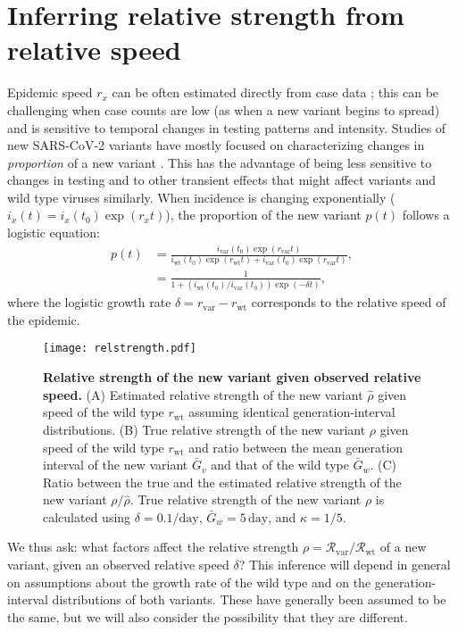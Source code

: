 \documentclass[12pt]{article}
\newcommand{\vvvar}{\mathrm{var}}
\newcommand{\wwwt}{\mathrm{wt}}
\newcommand{\rx}[1]{\ensuremath{{r}_{#1}}\xspace}
\newcommand{\rw}{\rx{\wwwt}}
\newcommand{\rv}{\rx{\vvvar}}
\newcommand{\Rx}[1]{\ensuremath{{\mathcal R}_{#1}}\xspace}
\newcommand{\Rw}{\Rx{\wwwt}}
\newcommand{\Rv}{\Rx{\vvvar}}
\newcommand{\days}{\ensuremath{\, \textrm{day}}}
\newcommand{\pday}{\ensuremath{/\textrm{day}}}
\newcommand{\ix}[1]{\ensuremath{{i}_{#1}}\xspace}
\newcommand{\iy}[1]{\ix{\mathrm{#1}}}
\begin{document}
\section{Inferring relative strength from relative speed}

Epidemic speed $r_x$ can be often estimated directly from case data \citep{mills2004transmissibility,nishiura2009transmission,ma2014estimating};
this can be challenging when case counts are low (as when a new variant begins to spread) and is sensitive to temporal changes in testing patterns and intensity.
Studies of new SARS-CoV-2 variants have mostly focused on characterizing changes in \emph{proportion} of a new variant \citep{switzerland2021variant, davies2021estimated, di2021impact, leung2021early, volz2021transmission,zhao2021}.
This has the advantage of being less sensitive to changes in testing and to other transient effects that might affect variants and wild type viruses similarly.
When incidence is changing exponentially ($i_x(t) = i_x(t_0) \exp(r_x t)$), the proportion of the new variant $p(t)$ follows a logistic equation:
\begin{align}
p(t) &= \frac{\iy{var}(t_0) \exp(\rv t)}{\iy{wt}(t_0) \exp(\rw t) + \iy{var}(t_0) \exp(\rv t)},
\\ &= \frac{1}{1 + \left(\iy{wt}(t_0)/\iy{var}(t_0)\right) \exp(-\delta t)},
\end{align}
where the logistic growth rate $\delta = \rv - \rw$ corresponds to the relative speed of the epidemic.

\begin{figure}[!th]
\texttt{[image: relstrength.pdf]}
\caption{
\textbf{Relative strength of the new variant given observed relative speed.}
(A) Estimated relative strength of the new variant $\hat{\rho}$ given speed of the wild type
$\rw$ assuming identical generation-interval distributions.
(B) True relative strength of the new variant $\rho$ given speed of the wild type $\rw$ and ratio between the mean generation interval of the new variant $\bar{G}_v$ and that of the wild type $\bar{G}_w$.
(C) Ratio between the true and the estimated relative strength of the new variant $\rho/\hat{\rho}$.
True relative strength of the new variant $\rho$ is calculated using $\delta=0.1\pday$, $\bar{G}_w = 5\days$, and $\kappa = 1/5$.
}
\label{fig:relstrength}
\end{figure}

We thus ask: what factors affect the relative strength $\rho = \Rv/\Rw$ of a new variant, given an observed relative speed $\delta$?
This inference will depend in general on assumptions about the growth rate of the wild type and on the generation-interval distributions of both variants.
These have generally been assumed to be the same, but we will also consider the possibility that they are different.
\end{document}
